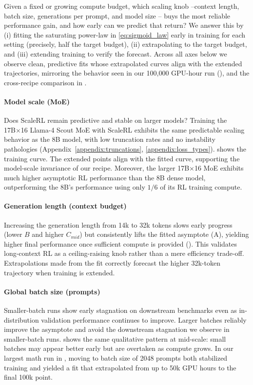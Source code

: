 Given a fixed or growing compute budget, which scaling knob --context length, batch size, generations per prompt, and model size -- buys the most reliable performance gain, and how early can we predict that return? We answer this by (i) fitting the saturating power-law in \cref{eq:sigmoid_law} early in training for each setting (precisely, half the target budget), (ii) extrapolating to the target budget, and (iii) extending training to verify the forecast. Across all axes below we observe clean, predictive fits whose extrapolated curves align with the extended trajectories, mirroring the behavior seen in our 100,000 GPU-hour run (), and the cross-recipe comparison in .


\paragraph{Model scale (MoE)}
Does ScaleRL remain predictive and stable on larger models? Training the 17B×16 Llama-4 Scout MoE with ScaleRL exhibits the same predictable scaling behavior as the 8B model, with low truncation rates and no instability pathologies (Appendix~\ref{appendix:truncations}, \ref{appendix:loss_types}).  shows the training curve. The extended points align with the fitted curve, supporting the model-scale invariance of our recipe. Moreover, the larger 17B×16 MoE exhibits much higher asymptotic RL performance than the 8B dense model, outperforming the 8B's performance using only $1/6$ of its RL training compute.

\paragraph{Generation length (context budget)}
Increasing the generation length from 14k to 32k tokens slows early progress (lower $B$ and higher $C_{mid}$) but consistently lifts the fitted asymptote (A), yielding higher final performance once sufficient compute is provided (). This validates long-context RL as a ceiling-raising knob rather than a mere efficiency trade-off. Extrapolations made from the fit correctly forecast the higher 32k-token trajectory when training is extended. 

\paragraph{Global batch size (prompts)} Smaller-batch runs show early stagnation on downstream benchmarks even as in-distribution validation performance continues to improve. Larger batches reliably improve the asymptote and avoid the downstream stagnation we observe in smaller-batch runs.  shows the same qualitative pattern at mid-scale: small batches may appear better early but are overtaken as compute grows. 
In our largest math run in , moving to batch size of 2048 prompts both stabilized training and yielded a fit that extrapolated from up to 50k GPU hours to the final 100k point.

